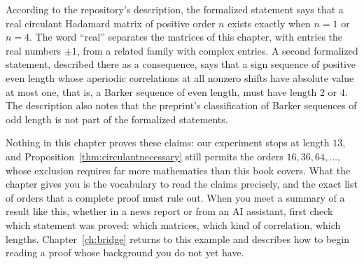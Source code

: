 According to the repository's description, the formalized statement says that a real circulant Hadamard matrix of positive order $n$ exists exactly when $n=1$ or $n=4$. The word ``real'' separates the matrices of this chapter, with entries the real numbers $\pm1$, from a related family with complex entries. A second formalized statement, described there as a consequence, says that a sign sequence of positive even length whose aperiodic correlations at all nonzero shifts have absolute value at most one, that is, a Barker sequence of even length, must have length $2$ or $4$. The description also notes that the preprint's classification of Barker sequences of odd length is not part of the formalized statements.

Nothing in this chapter proves these claims: our experiment stops at length $13$, and Proposition~\ref{thm:circulantnecessary} still permits the orders $16,36,64,\ldots$, whose exclusion requires far more mathematics than this book covers. What the chapter gives you is the vocabulary to read the claims precisely, and the exact list of orders that a complete proof must rule out. When you meet a summary of a result like this, whether in a news report or from an AI assistant, first check which statement was proved: which matrices, which kind of correlation, which lengths. Chapter~\ref{ch:bridge} returns to this example and describes how to begin reading a proof whose background you do not yet have.
